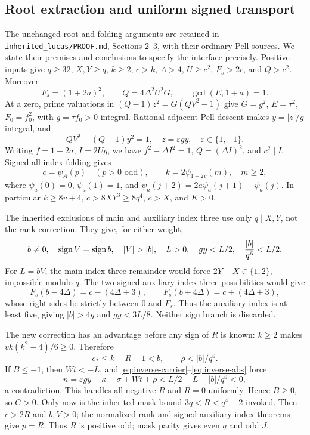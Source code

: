 \subsection{Root extraction and uniform signed transport}
The unchanged root and folding arguments are retained in
\texttt{inherited\_lucas/PROOF.md}, Sections 2--3, with their ordinary
Pell sources.  We state their premises and conclusions to specify the
interface precisely.  Positive inputs give \(q\ge32\), \(X,Y\ge q\),
\(k\ge2\), \(c>k\), \(A>4\), \(U\ge c^2\), \(F_s>2c\),
and \(Q>c^2\).  Moreover
\[
 F_s=(1+2a)^2,\qquad Q=4\Delta^2U^2G,\qquad\gcd(E,1+a)=1.
\]
At a zero, prime valuations in
\((Q-1)z^2=G(QV^2-1)\) give \(G=g^2\), \(E=\tau^2\),
\(F_0=f_0^2\), with \(g=\tau f_0>0\) integral.  Rational adjacent-Pell
descent makes \(y=|z|/g\) integral, and
\[
 QV^2-(Q-1)y^2=1,\quad z=\varepsilon gy,\quad
 \varepsilon\in\{1,-1\}.
\]
Writing \(f=1+2a\), \(I=2Ug\), we have
\(f^2-\Delta I^2=1\), \(Q=(\Delta I)^2\), and \(c^2\mid I\).
Signed all-index folding gives
\[
 c=\psi_A(p)\quad(p>0\text{ odd}),\qquad
 k=2\psi_{1+2v}(m),\quad m\ge2,
\]
where \(\psi_a(0)=0\), \(\psi_a(1)=1\), and
\(\psi_a(j+2)=2a\psi_a(j+1)-\psi_a(j)\).
In particular \(k\ge8v+4\), \(c>8XY^3\ge8q^4\), \(c>X\), and
\(K>0\).

The inherited exclusions of main and auxiliary index three use only
\(q\mid X,Y\), not the rank correction.  They give, for either weight,
\begin{equation}
 b\ne0,\quad \operatorname{sign}V=\operatorname{sign}b,
 \quad |V|>|b|,\quad L>0,\quad gy<L/2,
 \quad {|b|\over q^6}<L/2.\label{eq:inverse-abs}
\end{equation}
For \(L=bV\), the main index-three remainder would force
\(2Y-X\in\{1,2\}\), impossible modulo \(q\).  The two signed auxiliary
index-three possibilities would give
\[
 F_s(b-4\Delta)=c-(4\Delta+3),\qquad
 F_s(b+4\Delta)=c+(4\Delta+3),
\]
whose right sides lie strictly between \(0\) and \(F_s\).
Thus the auxiliary index is at least five, giving \(|b|>4g\) and
\(gy<3L/8\).  Neither sign branch is discarded.

The new correction has an advantage before any sign of \(R\) is known:
\(k\ge2\) makes \(vk(k^2-4)/6\ge0\).  Therefore
\[
 e_*\le k-R-1<b,\qquad \rho<|b|/q^6.
\]
If \(B\le-1\), then \(Wt<-L\), and
\eqref{eq:inverse-carrier}--\eqref{eq:inverse-abs} force
\[
 n=\varepsilon gy-\kappa-\sigma+Wt+\rho
   <L/2-L+|b|/q^6<0,
\]
a contradiction.  This handles all negative \(R\) and \(R=0\)
uniformly.  Hence \(B\ge0\), so \(C>0\).  Only now is the inherited
mask bound \(3q<R<q^4-2\) invoked.  Then \(c>2R\) and \(b,V>0\);
the normalized-rank and signed auxiliary-index theorems give \(p=R\).
Thus \(R\) is positive odd; mask parity gives even \(q\) and odd \(J\).

